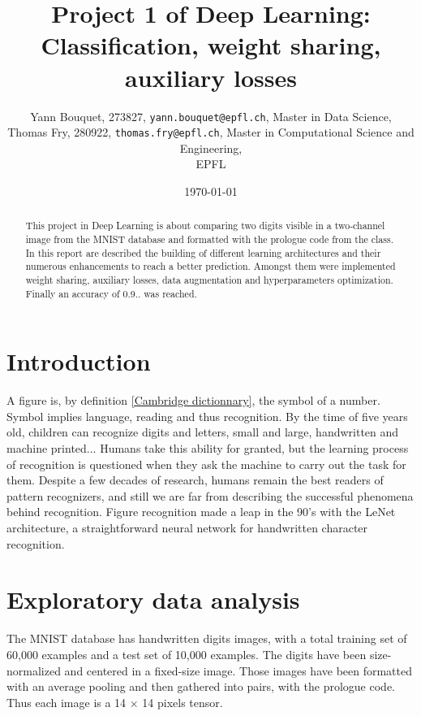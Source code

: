 \documentclass[10pt,conference,compsocconf]{IEEEtran}
\begin{document}
\title{Project 1 of Deep Learning:\\ Classification, weight sharing, auxiliary losses}

\author{Yann Bouquet, 273827, \texttt{yann.bouquet@epfl.ch}, Master in Data Science, \\
  Thomas Fry, 280922, \texttt{thomas.fry@epfl.ch}, Master in Computational Science and Engineering, \\
  EPFL
  \date{\today}}
\maketitle


\begin{abstract}
This project in Deep Learning is about comparing two digits visible in a two-channel image from the MNIST database and formatted with the prologue code from the class. 
In this report are described the building of different learning architectures and their numerous enhancements to reach a better prediction. Amongst them were implemented weight sharing, auxiliary losses, data augmentation and hyperparameters optimization. %
Finally an accuracy of 0.9.. was reached. %
\end{abstract}


\section{Introduction}
A figure is, by definition \ref{Cambridge dictionnary}, the symbol of a number. Symbol implies language, reading and thus recognition. By the time of five years old, children can recognize digits and letters, small and large, handwritten and machine printed... Humans take this ability for granted, but the learning process of recognition is questioned when they ask the machine to carry out the task for them. Despite a few decades of research, humans remain the best readers of pattern recognizers, and still we are far from describing the successful phenomena behind recognition. Figure recognition made a leap in the 90's with the LeNet architecture, a straightforward neural network for handwritten character recognition.

\section{Exploratory data analysis}
The MNIST database has handwritten digits images, with a total training set of 60,000 examples and a test set of 10,000 examples. The digits have been size-normalized and centered in a fixed-size image.
Those images have been formatted with an average pooling and then gathered into pairs, with the prologue code. Thus each image is a 14 $\times$ 14 pixels tensor. %
\end{document}
